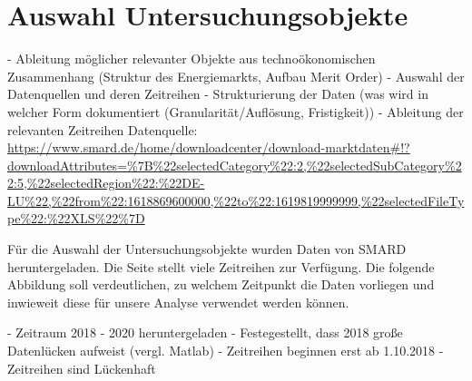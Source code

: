 \section{Auswahl Untersuchungsobjekte}
-	Ableitung möglicher relevanter Objekte aus technoökonomischen Zusammenhang (Struktur des Energiemarkts, Aufbau Merit Order)
-	Auswahl der Datenquellen und deren Zeitreihen
-	Strukturierung der Daten (was wird in welcher Form dokumentiert (Granularität/Auflösung, Fristigkeit))
-	Ableitung der relevanten Zeitreihen
Datenquelle: \url{https://www.smard.de/home/downloadcenter/download-marktdaten#!?downloadAttributes=%7B%22selectedCategory%22:2,%22selectedSubCategory%22:5,%22selectedRegion%22:%22DE-LU%22,%22from%22:1618869600000,%22to%22:1619819999999,%22selectedFileType%22:%22XLS%22%7D}


Für die Auswahl der Untersuchungsobjekte wurden Daten von SMARD heruntergeladen. Die Seite stellt viele Zeitreihen zur Verfügung.
Die folgende Abbildung soll verdeutlichen, zu welchem Zeitpunkt die Daten vorliegen und inwieweit diese für unsere Analyse verwendet werden können.


- Zeitraum 2018 - 2020 heruntergeladen
- Festegestellt, dass 2018 große Datenlücken aufweist (vergl. Matlab)
  - Zeitreihen beginnen erst ab 1.10.2018
  - Zeitreihen sind Lückenhaft
  
